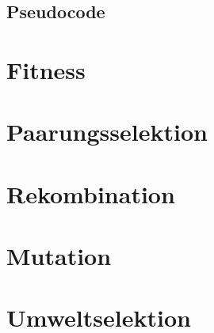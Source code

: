 \subsection{Pseudocode}
\section{Fitness}
\section{Paarungsselektion}
\section{Rekombination}
\section{Mutation}
\section{Umweltselektion}
